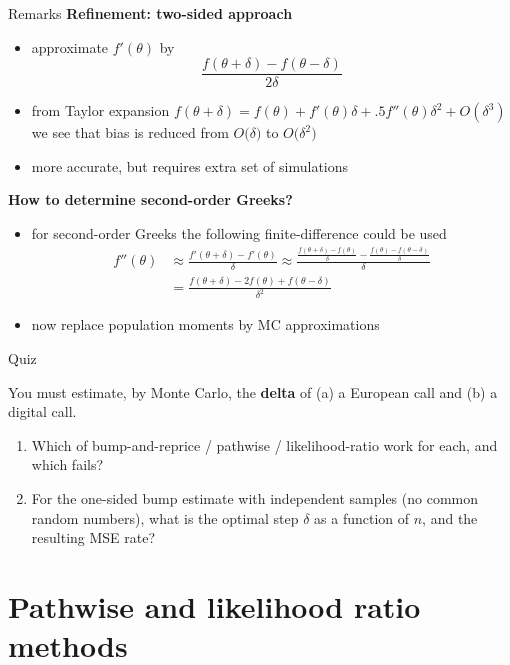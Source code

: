 \documentclass[pdf, handout]{beamer}
\begin{document}
\begin{frame}{Remarks}
\textbf{Refinement: two-sided approach}
\begin{itemize}
\item
approximate $f'(\theta)$ by
\[
\frac{f(\theta+\delta) - f(\theta -\delta)    }{2\delta}
\]
\item from Taylor expansion $f(\theta+\delta)=f(\theta) + f'(\theta)\delta
+.5f''(\theta)\delta^2 + O(\delta^3)$  we see that bias is reduced
from  $O\big(\delta\big)$ to $O\big(\delta^2\big)$
\item  more accurate, but
requires extra set of simulations
\end{itemize}
\textbf{How to determine second-order Greeks?}
\begin{itemize}
\item for second-order Greeks the following finite-difference could be used
\begin{align*}
f''(\theta) &\approx
\frac{ f'(\theta+\delta)  - f'(\theta)}{\delta}\approx
\frac{\frac{ f(\theta+\delta) -f(\theta)}{\delta} -
\frac{ f(\theta) -f(\theta-\delta)}{\delta}
}{\delta}\\
&
= \frac{f(\theta+\delta) - 2f(\theta) + f(\theta-\delta) }{\delta^2}
\end{align*}
\item now  replace population moments by MC approximations
\end{itemize}
\end{frame}

\begin{frame}{Quiz}
\begin{quizbox}
You must estimate, by Monte Carlo, the \textbf{delta} of (a) a European call and (b) a digital call.
\begin{enumerate}
\item Which of bump-and-reprice / pathwise / likelihood-ratio work for each, and which fails?
\item For the one-sided bump estimate with independent samples (no common random numbers), what is the optimal step $\delta$ as a function of $n$, and the resulting MSE rate?
\end{enumerate}
\end{quizbox}
\end{frame}

\section{Pathwise and likelihood ratio methods}
\end{document}

